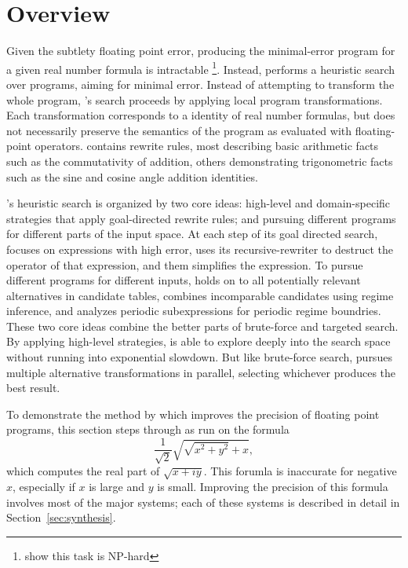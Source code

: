 \documentclass[paper.tex]{subfiles}
\begin{document}
\section{Overview}
\label{sec:overview}


Given the subtlety floating point error, producing the minimal-error
program for a given real number formula is intractable
\footnote{\cite{} show this task is NP-hard}.  Instead, \casio
performs a heuristic search over programs, aiming for minimal error.
Instead of attempting to transform the whole program, \casio's search
proceeds by applying local program transformations.  Each
transformation corresponds to a identity of real number formulas, but
does not necessarily preserve the semantics of the program as
evaluated with floating-point operators.  \casio contains \nRewrites
rewrite rules, most describing basic arithmetic facts such as the
commutativity of addition, others demonstrating trigonometric facts
such as the sine and cosine angle addition identities.

\casio's heuristic search is organized by two core ideas: high-level
and domain-specific strategies that apply goal-directed rewrite rules;
and pursuing different programs for different parts of the input
space.  At each step of its goal directed search, \casio focuses on
expressions with high error, uses its recursive-rewriter to destruct
the operator of that expression, and them simplifies the expression.
To pursue different programs for different inputs, \casio holds on to
all potentially relevant alternatives in candidate tables, combines
incomparable candidates using regime inference, and analyzes periodic
subexpressions for periodic regime boundries.  These two core ideas
combine the better parts of brute-force and targeted search.  By
applying high-level strategies, \casio is able to explore deeply into
the search space without running into exponential slowdown.  But like
brute-force search, \casio pursues multiple alternative
transformations in parallel, selecting whichever produces the best
result.

To demonstrate the method by which
  \casio improves the precision of floating point programs,
  this section steps through \casio as run on the formula
\begin{equation}\label{eq:ex}
  \frac1{\sqrt2} \sqrt{\sqrt{x^2 + y^2} + x},
\end{equation}
  which computes the real part of $\sqrt{x + i y}$.
This forumla is inaccurate for negative $x$,
  especially if $x$ is large and $y$ is small.
Improving the precision of this formula
  involves most of the major systems;
  each of these systems is described in detail
  in Section~\ref{sec:synthesis}.
\end{document}
